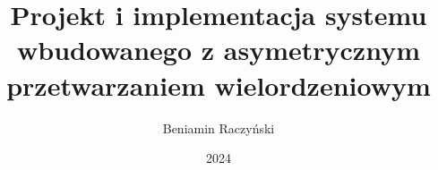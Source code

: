 \documentclass[thesis=inz,faculty=ee]{EE-dyplom}
\title{Projekt i implementacja systemu wbudowanego z asymetrycznym przetwarzaniem wielordzeniowym}
\author{Beniamin Raczyński}
\date{2024}
\begin{document}
    \frontpages
    

    
    
    
    
    
    
    
    

    \bibliografia

    
    \acronymslist
    \listoffigures
    \listoftables
    \easyappendices
\end{document}
